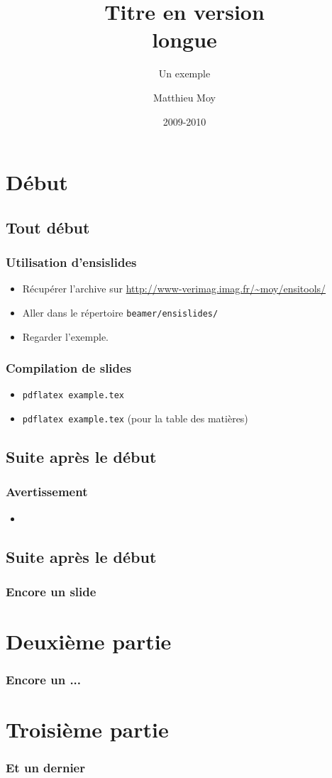 \documentclass{beamer}
\title[Version courte du titre]{Titre en version\\longue}
\subtitle{Un exemple} %
\author{Matthieu Moy}
\institute{Ensimag}
\date{2009-2010}
\begin{document}
\begin{frame}
  \titlepage
\end{frame}

\section{Début}

\subsection{Tout début}

\begin{frame} \frametitle{Utilisation d'ensislides}
  \begin{itemize}
  \item Récupérer l'archive sur \url{http://www-verimag.imag.fr/~moy/ensitools/}
  \item Aller dans le répertoire {\tt beamer/ensislides/}
  \item Regarder l'exemple.
  \end{itemize}
\end{frame}

\begin{frame} \frametitle{Compilation de slides}
  \begin{itemize}
  \item {\tt pdflatex example.tex}
    \pause
  \item {\tt pdflatex example.tex} (pour la table des matières)
  \end{itemize}
  \pause
\end{frame}

\subsection{Suite après le début}

\begin{frame} \frametitle{Avertissement}
  \begin{itemize}
  \item {}
  \end{itemize}
\end{frame}


\subsection{Suite après le début}

\begin{frame}
  \frametitle{Encore un slide}
\end{frame}

\section[Deux]{Deuxième partie}

\begin{frame}
  \frametitle{Encore un ...}
\end{frame}

\section[Trois]{Troisième partie}

\begin{frame}
  \frametitle{Et un dernier}
\end{frame}
\end{document}
